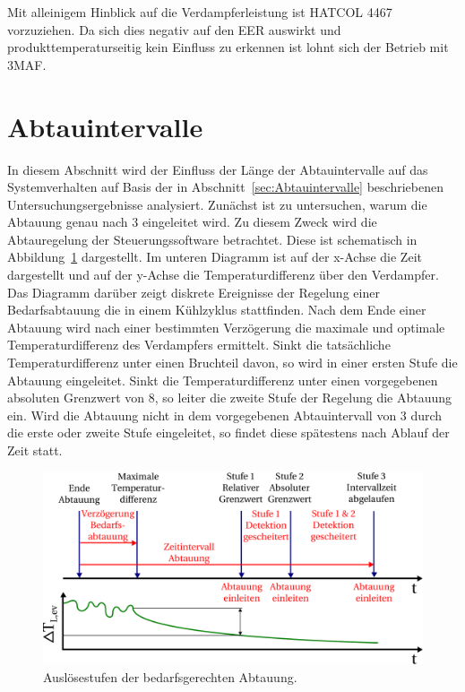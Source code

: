 Mit alleinigem Hinblick auf die Verdampferleistung ist HATCOL 4467 vorzuziehen.
Da sich dies negativ auf den EER auswirkt und produkttemperaturseitig kein Einfluss zu erkennen ist lohnt sich der Betrieb mit 3MAF.










\clearpage




\section{Abtauintervalle}
\label{sec:AbtauintervalleAnalyse}

In diesem Abschnitt wird der Einfluss der Länge der Abtauintervalle auf das Systemverhalten auf Basis der in Abschnitt~\ref{sec:Abtauintervalle} beschriebenen Untersuchungsergebnisse analysiert. \newline
Zunächst ist zu untersuchen, warum die Abtauung genau nach \unit{3}{\hour} eingeleitet wird. Zu diesem Zweck wird die Abtauregelung der Steuerungssoftware betrachtet. Diese ist schematisch in Abbildung~\ref{fig:bedarfsgerechteAbtauung} dargestellt. Im unteren Diagramm ist auf der x-Achse die Zeit dargestellt und auf der y-Achse die Temperaturdifferenz über den Verdampfer. Das Diagramm darüber zeigt diskrete Ereignisse  der Regelung einer Bedarfsabtauung die in einem Kühlzyklus stattfinden.
Nach dem Ende einer Abtauung wird nach einer bestimmten Verzögerung die maximale und optimale Temperaturdifferenz des Verdampfers ermittelt. Sinkt die tatsächliche Temperaturdifferenz unter einen Bruchteil davon, so wird in einer ersten Stufe die Abtauung eingeleitet. Sinkt die Temperaturdifferenz unter einen vorgegebenen absoluten Grenzwert von \unit{8}{\kelvin}, so leiter die zweite Stufe der Regelung die Abtauung ein. Wird die Abtauung nicht in dem vorgegebenen Abtauintervall von \unit{3}{\hour} durch die erste oder zweite Stufe eingeleitet, so findet diese spätestens nach Ablauf der Zeit statt.

\begin{figure}[h!]
\centering
\includegraphics[scale=0.55]{Pictures/defrostintervall.pdf}
\caption{Auslösestufen der bedarfsgerechten Abtauung.}
\label{fig:bedarfsgerechteAbtauung}
\end{figure}

